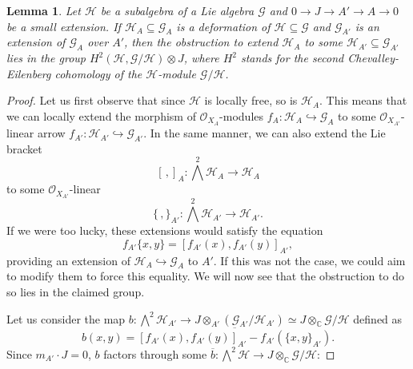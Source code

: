 \documentclass[reqno]{amsart}
\newcommand\C{\mathbb{C}}
\newcommand{\OO}{\mathcal{O}}
\newtheorem{lemma}[theorem]{Lemma}
\theoremstyle{definition}
\theoremstyle{named}
\begin{document}
\begin{lemma}
\label{lema:defLie}    Let $\mathcal H$ be a subalgebra of a Lie algebra $\mathcal G$ and $0\to J\to A'\to A\to 0$ be a small extension. If $\mathcal{H}_A\subseteq \mathcal G_A$ is a deformation of $\mathcal H\subseteq \mathcal G$ and $\mathcal G_{A'}$ is an extension of $\mathcal G_A$ over $A'$, then the obstruction to extend $\mathcal H_A$ to some $\mathcal H_{A'}\subseteq \mathcal G_{A'}$ lies in the group $H^2(\mathcal H,\mathcal G/\mathcal H)\otimes J$, where $H^2$ stands for the second Chevalley-Eilenberg cohomology of the $\mathcal H$-module $\mathcal{G}/\mathcal H$.
\end{lemma}
\begin{proof}
Let us first observe that since $\mathcal H$ is locally free,  so is $\mathcal H_{A}$. This means that we can locally extend the morphism 
of $\OO_{X_A}$-modules $f_A:\mathcal{H}_A\hookrightarrow \mathcal{G}_A$ to some $\OO_{X_{A'}}$-linear arrow $f_{A'}:\mathcal{H}_{A'}\hookrightarrow \mathcal{G}_{A'}$.
In the same manner, we can also extend the Lie bracket
$$ [\,,]_A: \bigwedge^2\mathcal H_{A}\to \mathcal H_{A}$$
to some $\OO_{X_{A'}}$-linear
$$ \{\,,\}_{A'}: \bigwedge^2\mathcal H_{A'}\to \mathcal H_{A'}.$$
If we were too lucky, these extensions would satisfy the equation 
$$ f_{A'}\{x,y\}=[f_{A'}(x),f_{A'}(y)]_{A'},$$
providing an extension of $\mathcal H_{A}\hookrightarrow \mathcal G_A$ to $A'$. 
If this was not the case, we could aim to modify them to force this equality. We will now see that the obstruction to do so lies in the claimed group.


Let us consider the map $b:\bigwedge^2\mathcal H_{A'}\to J\otimes_{A'}(\mathcal G_{A'}/\mathcal H_{A'})\simeq J\otimes_\C \mathcal G/\mathcal H$
defined as 
$$ b(x,y)=\overline{[f_{A'}(x),f_{A'}(y)]_{A'}-f_{A'}(\{x,y\}_{A'})}.$$
Since $m_{A'}\cdot J=0$, $b$ factors through some $\overline{b}:\bigwedge^2\mathcal H\to  J\otimes_\C \mathcal G/\mathcal H$:



\end{proof}
\end{document}
